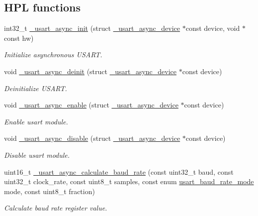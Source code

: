 \subsection*{H\+PL functions}
\begin{DoxyCompactItemize}
\item 
int32\+\_\+t \hyperlink{group___h_p_l_ga11745e0bd0c9d636afbefae8e209665e}{\+\_\+usart\+\_\+async\+\_\+init} (struct \hyperlink{struct__usart__async__device}{\+\_\+usart\+\_\+async\+\_\+device} $\ast$const device, void $\ast$const hw)
\begin{DoxyCompactList}\small\item\em Initialize asynchronous U\+S\+A\+RT. \end{DoxyCompactList}\item 
void \hyperlink{group___h_p_l_ga57e2ef9f6ec11c53a9d88bdb7a82aac4}{\+\_\+usart\+\_\+async\+\_\+deinit} (struct \hyperlink{struct__usart__async__device}{\+\_\+usart\+\_\+async\+\_\+device} $\ast$const device)
\begin{DoxyCompactList}\small\item\em Deinitialize U\+S\+A\+RT. \end{DoxyCompactList}\item 
void \hyperlink{group___h_p_l_ga86c4101798d9dbc584f1e56615140d6f}{\+\_\+usart\+\_\+async\+\_\+enable} (struct \hyperlink{struct__usart__async__device}{\+\_\+usart\+\_\+async\+\_\+device} $\ast$const device)
\begin{DoxyCompactList}\small\item\em Enable usart module. \end{DoxyCompactList}\item 
void \hyperlink{group___h_p_l_gadb6751e5c270eb88eb754f45e7b8a91f}{\+\_\+usart\+\_\+async\+\_\+disable} (struct \hyperlink{struct__usart__async__device}{\+\_\+usart\+\_\+async\+\_\+device} $\ast$const device)
\begin{DoxyCompactList}\small\item\em Disable usart module. \end{DoxyCompactList}\item 
uint16\+\_\+t \hyperlink{group___h_p_l_gab834a3310b05b1118ac7cf5ad90835ba}{\+\_\+usart\+\_\+async\+\_\+calculate\+\_\+baud\+\_\+rate} (const uint32\+\_\+t baud, const uint32\+\_\+t clock\+\_\+rate, const uint8\+\_\+t samples, const enum \hyperlink{group___h_p_l_ga59141b5eb86f4d53f17bbeab1d7c83e7}{usart\+\_\+baud\+\_\+rate\+\_\+mode} mode, const uint8\+\_\+t fraction)
\begin{DoxyCompactList}\small\item\em Calculate baud rate register value. \end{DoxyCompactList}\item 

\end{DoxyCompactItemize}
